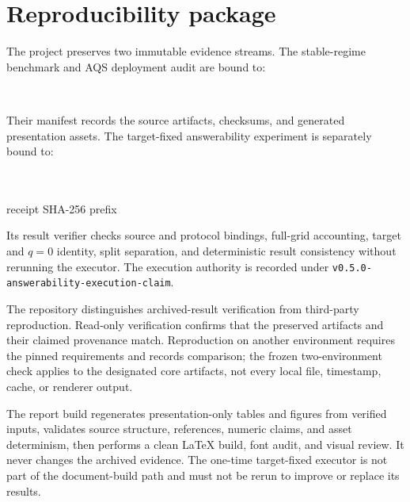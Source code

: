 \section{Reproducibility package}
\suppressfloats[t]
\label{sec:reproducibility}

The project preserves two immutable evidence streams. The stable-regime
benchmark and AQS deployment audit are bound to:
\begin{center}
\small\texttt{\EvidenceTag{}}\\
\texttt{\EvidenceCommit{}}
\end{center}
Their manifest records the source artifacts, checksums, and generated
presentation assets. The target-fixed answerability experiment is separately
bound to:
\begin{center}
\small\texttt{\VFiveFreezeTag{}}\\
\texttt{\VFiveExecutionCommit{}}\\
receipt SHA-256 prefix \texttt{\VFiveReceiptSHA{}}
\end{center}
Its result verifier checks source and protocol bindings, full-grid accounting,
target and $q=0$ identity, split separation, and deterministic result
consistency without rerunning the executor.
The execution authority is recorded under
\texttt{v0.5.0-answerability-execution-claim}.



The repository distinguishes archived-result verification from third-party
reproduction. Read-only verification confirms that the preserved artifacts and
their claimed provenance match. Reproduction on another environment requires
the pinned requirements and records comparison; the frozen two-environment
check applies to the designated core artifacts, not every local file,
timestamp, cache, or renderer output.

The report build regenerates presentation-only tables and figures from verified
inputs, validates source structure, references, numeric claims, and asset
determinism, then performs a clean LaTeX build, font audit, and visual review.
It never changes the archived evidence. The one-time target-fixed executor is
not part of the document-build path and must not be rerun to improve or replace
its results.
